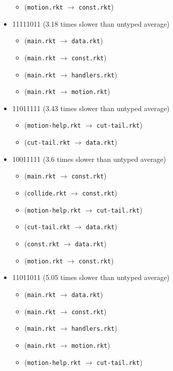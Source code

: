 \documentclass{article}
\newcommand{\mono}[1]{\texttt{#1}}
\begin{document}
\begin{itemize}
\begin{itemize}
  \item (\mono{motion.rkt} $\rightarrow$ \mono{const.rkt})
  \end{itemize}
\item 11111011 (3.18 times slower than untyped average)
  \begin{itemize}
  \item (\mono{main.rkt} $\rightarrow$ \mono{data.rkt})
  \item (\mono{main.rkt} $\rightarrow$ \mono{const.rkt})
  \item (\mono{main.rkt} $\rightarrow$ \mono{handlers.rkt})
  \item (\mono{main.rkt} $\rightarrow$ \mono{motion.rkt})
  \end{itemize}
\item 11011111 (3.43 times slower than untyped average)
  \begin{itemize}
  \item (\mono{motion-help.rkt} $\rightarrow$ \mono{cut-tail.rkt})
  \item (\mono{cut-tail.rkt} $\rightarrow$ \mono{data.rkt})
  \end{itemize}
\item 10011111 (3.6 times slower than untyped average)
  \begin{itemize}
  \item (\mono{main.rkt} $\rightarrow$ \mono{const.rkt})
  \item (\mono{collide.rkt} $\rightarrow$ \mono{const.rkt})
  \item (\mono{motion-help.rkt} $\rightarrow$ \mono{cut-tail.rkt})
  \item (\mono{cut-tail.rkt} $\rightarrow$ \mono{data.rkt})
  \item (\mono{const.rkt} $\rightarrow$ \mono{data.rkt})
  \item (\mono{motion.rkt} $\rightarrow$ \mono{const.rkt})
  \end{itemize}
\item 11011011 (5.05 times slower than untyped average)
  \begin{itemize}
  \item (\mono{main.rkt} $\rightarrow$ \mono{data.rkt})
  \item (\mono{main.rkt} $\rightarrow$ \mono{const.rkt})
  \item (\mono{main.rkt} $\rightarrow$ \mono{handlers.rkt})
  \item (\mono{main.rkt} $\rightarrow$ \mono{motion.rkt})
  \item (\mono{motion-help.rkt} $\rightarrow$ \mono{cut-tail.rkt})

\end{itemize}
\end{itemize}
\end{document}
